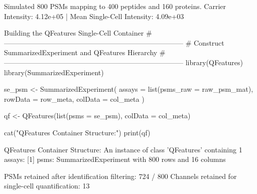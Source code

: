 \documentclass[11pt,twoside,openright]{book}
\begin{document}
\begin{routput}
Simulated 800 PSMs mapping to 400 peptides and 160 proteins.
Carrier Intensity: 4.12e+05 | Mean Single-Cell Intensity: 4.09e+03
\end{routput}

\begin{rchunk}{Building the QFeatures Single-Cell Container}
# -----------------------------------------------------------------------------
# Construct SummarizedExperiment and QFeatures Hierarchy
# -----------------------------------------------------------------------------
library(QFeatures)
library(SummarizedExperiment)

se_psm <- SummarizedExperiment(
  assays  = list(psms_raw = raw_psm_mat),
  rowData = row_meta,
  colData = col_meta
)

qf <- QFeatures(list(psms = se_psm), colData = col_meta)

cat("QFeatures Container Structure:\n")
print(qf)
\end{rchunk}

\begin{routput}
QFeatures Container Structure:
An instance of class 'QFeatures' containing 1 assays:
{}[1] psms: SummarizedExperiment with 800 rows and 16 columns
\end{routput}


\begin{routput}
PSMs retained after identification filtering: 724 / 800
Channels retained for single-cell quantification: 13
\end{routput}
\end{document}
